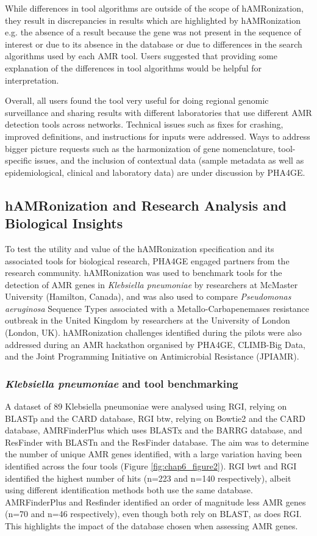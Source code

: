 While differences in tool algorithms are outside of the scope of hAMRonization, they result in discrepancies in results which are highlighted by hAMRonization e.g. the absence of a result because the gene was not present in the sequence of interest or due to its absence in the database or due to differences in the search algorithms used by each AMR tool. Users suggested that providing some explanation of the differences in tool algorithms would be helpful for interpretation.

Overall, all users found the tool very useful for doing regional genomic surveillance and sharing results with different laboratories that use different AMR detection tools across networks. Technical issues such as fixes for crashing, improved definitions, and instructions for inputs were addressed. Ways to address bigger picture requests such as the harmonization of gene nomenclature, tool-specific issues, and the inclusion of contextual data (sample metadata as well as epidemiological, clinical and laboratory data) are under discussion by PHA4GE.

\subsection{hAMRonization and Research Analysis and Biological Insights}

To test the utility and value of the hAMRonization specification and its associated tools for biological research, PHA4GE engaged partners from the research community. hAMRonization was used to benchmark tools for the detection of AMR genes in \textit{Klebsiella pneumoniae} by researchers at McMaster University (Hamilton, Canada), and was also used to compare \textit{Pseudomonas aeruginosa} Sequence Types associated with a Metallo-Carbapenemases resistance outbreak in the United Kingdom by researchers at the University of London (London, UK). hAMRonization challenges identified during the pilots were also addressed during an AMR hackathon organised by PHA4GE, CLIMB-Big Data, and the Joint Programming Initiative on Antimicrobial Resistance (JPIAMR).

\subsubsection{\textit{Klebsiella pneumoniae} and tool benchmarking}

A dataset of 89 Klebsiella pneumoniae were analysed using RGI, relying on BLASTp and the CARD database, RGI btw, relying on Bowtie2 and the CARD database, AMRFinderPlus which uses BLASTx and the BARRG database, and ResFinder with BLASTn and the ResFinder database. The aim was to determine the number of unique AMR genes identified, with a large variation having been identified across the four tools (Figure \ref{fig:chap6_figure2}). RGI bwt and RGI identified the highest number of hits (n=223 and n=140 respectively), albeit using different identification methods both use the same database. AMRFinderPlus and Resfinder identified an order of magnitude less AMR genes (n=70 and n=46 respectively), even though both rely on BLAST, as does RGI. This highlights the impact of the database chosen when assessing AMR genes. 

